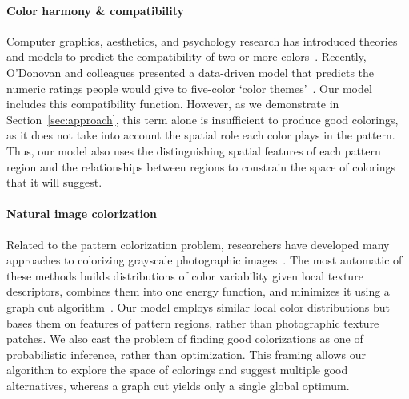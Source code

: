 \paragraph{Color harmony \& compatibility}
Computer graphics, aesthetics, and psychology research has introduced theories and models to predict the compatibility of two or more colors~\cite{CohenOrHarmonization,Munsell,PalmerColorPreference,Itten}. Recently, O'Donovan and colleagues presented a data-driven model that predicts the numeric ratings people would give to five-color `color themes'~.
Our model includes this compatibility function. However, as we demonstrate in Section~\ref{sec:approach}, this term alone is insufficient to produce good colorings, as it does not take into account the spatial role each color plays in the pattern. Thus, our model also uses the distinguishing spatial features of each pattern region and the relationships between regions to constrain the space of colorings that it will suggest.

\paragraph{Natural image colorization}
Related to the pattern colorization problem, researchers have developed many approaches to colorizing grayscale photographic images~\cite{ScribbleColorization,TransferColorization}. The most automatic of these methods builds distributions of color variability given local texture descriptors, combines them into one energy function, and minimizes it using a graph cut algorithm~\cite{MultimodalColorization}. Our model employs similar local color distributions but bases them on features of pattern regions, rather than photographic texture patches. We also cast the problem of finding good colorizations as one of probabilistic inference, rather than optimization. This framing allows our algorithm to explore the space of colorings and suggest multiple good alternatives, whereas a graph cut yields only a single global optimum.

